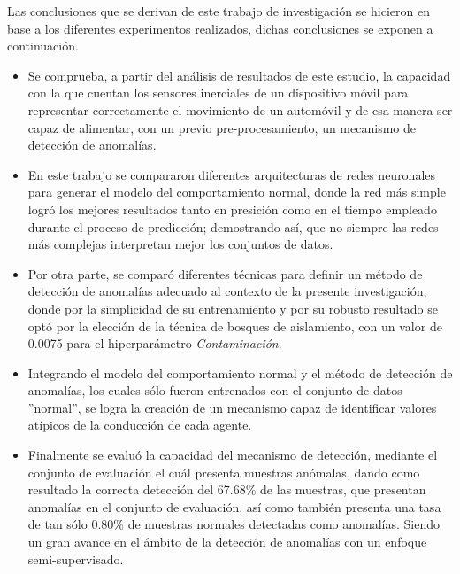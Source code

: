 \vspace{5mm} %

Las conclusiones que se derivan de este trabajo de investigaci\'{o}n se hicieron en base a los diferentes experimentos realizados, dichas conclusiones se exponen a continuaci\'{o}n.

\begin{itemize}
\item Se comprueba, a partir del an\'{a}lisis de resultados de este estudio, la capacidad con la que cuentan los sensores inerciales de un dispositivo m\'{o}vil para representar correctamente el movimiento de un autom\'{o}vil y de esa manera ser capaz de alimentar, con un previo pre-procesamiento, un mecanismo de detecci\'{o}n de anomal\'{i}as.
\item En este trabajo se compararon diferentes arquitecturas de redes neuronales para generar el modelo del comportamiento normal, donde la red m\'{a}s simple logr\'{o} los mejores resultados tanto en presici\'{o}n como en el tiempo empleado durante el proceso de predicci\'{o}n; demostrando as\'{i}, que no siempre las redes m\'{a}s complejas interpretan mejor los conjuntos de datos.
\item Por otra parte, se compar\'{o} diferentes t\'{e}cnicas para definir un m\'{e}todo de detecci\'{o}n de anomal\'{i}as adecuado al contexto de la presente investigaci\'{o}n, donde por la simplicidad de su entrenamiento y por su robusto resultado se opt\'{o} por la elecci\'{o}n de la t\'{e}cnica de bosques de aislamiento, con un valor de 0.0075 para el hiperpar\'{a}metro \textit{Contaminaci\'{o}n}.
\item Integrando el modelo del comportamiento normal y el m\'{e}todo de detecci\'{o}n de anomal\'{i}as, los cuales s\'{o}lo fueron entrenados con el conjunto de datos ''normal'', se logra la creaci\'{o}n de un mecanismo capaz de identificar valores at\'{i}picos de la conducci\'{o}n de cada agente.
\item Finalmente se evalu\'{o} la capacidad del mecanismo de detecci\'{o}n, mediante el conjunto de evaluaci\'{o}n el cu\'{a}l presenta muestras an\'{o}malas, dando como resultado la correcta detecci\'{o}n del 67.68\% de las muestras, que presentan anomal\'{i}as en el conjunto de evaluaci\'{o}n, as\'{i} como tambi\'{e}n presenta una tasa de tan s\'{o}lo 0.80\% de muestras normales detectadas como anomal\'{i}as. Siendo un gran avance en el \'{a}mbito de la detecci\'{o}n de anomal\'{i}as con un enfoque semi-supervisado.%
\end{itemize}

